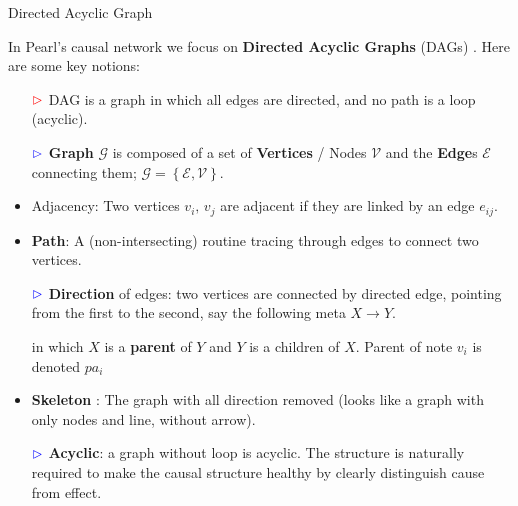 \begin{point}
    Directed Acyclic Graph
\end{point}

In Pearl's causal network we focus on \textbf{Directed Acyclic Graphs} (DAGs) . Here are some key notions:
\begin{itemize}[topsep=2pt,itemsep=0pt]
    \item[$ \color{red}\vartriangleright  $] DAG is a graph in which all edges are directed, and no path is a loop (acyclic).
    \item[$ \color{blue}\vartriangleright  $] \textbf{Graph} $ \mathcal{G}$ is composed of a set of \textbf{Vertices}  / Nodes $\mathcal{V} $ and the \textbf{Edge}s $ \mathcal{E} $ connecting them; $\mathcal{G} = \left\{\mathcal{E},\mathcal{V}\right\} $.
    \item Adjacency: Two vertices $ v_i ,\,v_j$ are adjacent if they are linked by an edge $ e_{ij} $.
    \item \textbf{Path}: A (non-intersecting) routine tracing through edges to connect two vertices. 
    \item[$ \color{blue}\vartriangleright $] \textbf{Direction}  of edges: two vertices are connected by directed edge, pointing from the first to the second, say the following meta $ X\to Y $. 
    \begin{figure}[H]
        \centering          
        \end{figure}
    in which $ X $ is a \textbf{parent} of $ Y $ and $ Y $ is a children of $ X $. Parent of note $ v_i $ is denoted $ pa_i $
    \item \textbf{Skeleton} : The graph with all direction removed (looks like a graph with only nodes and line, without arrow).
    \item[$ \color{blue}\vartriangleright $]  \textbf{Acyclic}: a graph without loop is acyclic. The structure is naturally required to make the causal structure healthy by clearly distinguish cause from effect.
\end{itemize}

